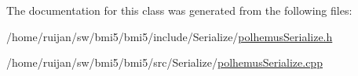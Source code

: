 The documentation for this class was generated from the following files\-:\begin{DoxyCompactItemize}
\item 
/home/ruijan/sw/bmi5/bmi5/include/\-Serialize/\hyperlink{polhemusSerialize_8h}{polhemus\-Serialize.\-h}\item 
/home/ruijan/sw/bmi5/bmi5/src/\-Serialize/\hyperlink{polhemusSerialize_8cpp}{polhemus\-Serialize.\-cpp}\end{DoxyCompactItemize}
